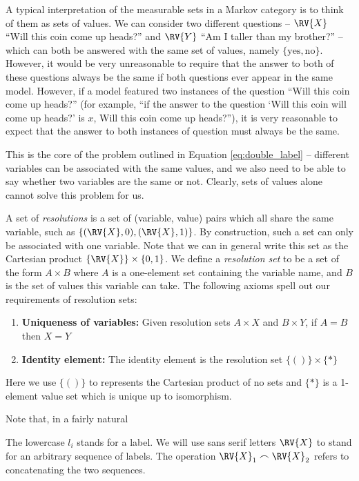 
A typical interpretation of the measurable sets in a Markov category is to think of them as sets of values. We can consider two different questions -- $\RV{X}$ ``Will this coin come up heads?'' and $\RV{Y}$ ``Am I taller than my brother?'' -- which can both be answered with the same set of values, namely $\{\text{yes},\text{no}\}$. However, it would be very unreasonable to require that the answer to both of these questions always be the same if both questions ever appear in the same model. However, if a model featured two instances of the question ``Will this coin come up heads?'' (for example, ``if the answer to the question `Will this coin will come up heads?' is $x$, Will this coin come up heads?''), it is very reasonable to expect that the answer to both instances of question must always be the same.

This is the core of the problem outlined in Equation \ref{eq:double_label} -- different variables can be associated with the same values, and we also need to be able to say whether two variables are the same or not. Clearly, sets of values alone cannot solve this problem for us.

A set of \emph{resolutions} is a set of (variable, value) pairs which all share the same variable, such as $\{(\RV{X},0),(\RV{X},1)\}$. By construction, such a set can only be associated with one variable. Note that we can in general write this set as the Cartesian product $\{\RV{X}\}\times \{0,1\}$. We define a \emph{resolution set} to be a set of the form $A\times B$ where $A$ is a one-element set containing the variable name, and $B$ is the set of values this variable can take. The following axioms spell out our requirements of resolution sets:

\begin{enumerate}
    \item \textbf{Uniqueness of variables:} Given resolution sets $A\times X$ and $B\times Y$, if $A=B$ then $X=Y$
    \item \textbf{Identity element:} The identity element is the resolution set $\{()\}\times\{*\}$
\end{enumerate}

Here we use $\{()\}$ to represents the Cartesian product of no sets and $\{*\}$ is a 1-element value set which is unique up to isomorphism.

Note that, in a fairly natural

The lowercase $l_i$ stands for a label. We will use sans serif letters $\RV{X}$ to stand for an arbitrary sequence of labels. The operation $\RV{X}_1\frown \RV{X}_2$ refers to concatenating the two sequences.

